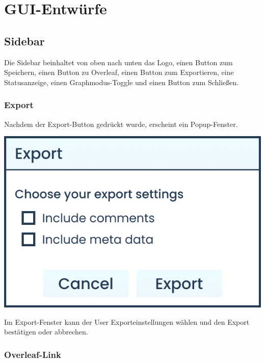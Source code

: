 \section{GUI-Entwürfe}
\label{sec:gui-entwuerfe}

\subsection{Sidebar}
\label{subsec:sidebar}

Die Sidebar beinhaltet von oben nach unten das Logo, einen Button zum Speichern, einen Button zu Overleaf, einen Button
zum Exportieren, eine Statusanzeige, einen Graphmodus-Toggle und einen Button zum Schließen.

\subsubsection{Export}

Nachdem der Export-Button gedrückt wurde, erscheint ein Popup-Fenster.

\begin{center}
  \begin{minipage}{0.5\linewidth}
    \includegraphics[width=\textwidth]{assets/img/Export_Box}
  \end{minipage}
\end{center}

Im Export-Fenster kann der User Exporteinstellungen wählen und den Export bestätigen oder abbrechen.

\subsubsection{Overleaf-Link}

